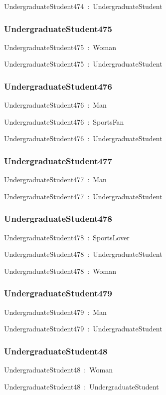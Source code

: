 \documentclass{article}
\begin{document}
UndergraduateStudent474~:~UndergraduateStudent

\subsubsection*{UndergraduateStudent475}

UndergraduateStudent475~:~Woman

UndergraduateStudent475~:~UndergraduateStudent

\subsubsection*{UndergraduateStudent476}

UndergraduateStudent476~:~Man

UndergraduateStudent476~:~SportsFan

UndergraduateStudent476~:~UndergraduateStudent

\subsubsection*{UndergraduateStudent477}

UndergraduateStudent477~:~Man

UndergraduateStudent477~:~UndergraduateStudent

\subsubsection*{UndergraduateStudent478}

UndergraduateStudent478~:~SportsLover

UndergraduateStudent478~:~UndergraduateStudent

UndergraduateStudent478~:~Woman

\subsubsection*{UndergraduateStudent479}

UndergraduateStudent479~:~Man

UndergraduateStudent479~:~UndergraduateStudent

\subsubsection*{UndergraduateStudent48}

UndergraduateStudent48~:~Woman

UndergraduateStudent48~:~UndergraduateStudent
\end{document}
